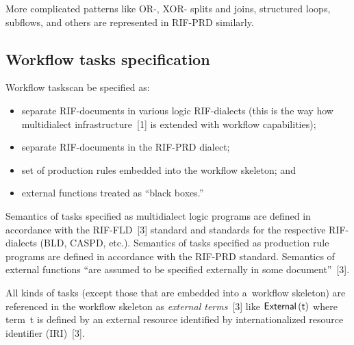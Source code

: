 \begin{multicols}{2}
\vspace*{-1.5pt}

  More complicated patterns like OR-, XOR- splits and joins, structured loops,
subflows, and others are represented in RIF-PRD similarly.

\vspace*{-6pt}

\subsection{Workflow tasks specification}

  \noindent
  Workflow taskscan be specified as:
  \begin{itemize}
\item separate RIF-documents in various logic RIF-dialects (this is the way how
multidialect infrastructure~[1] is extended with workflow capabilities);\\[-15pt]
\item separate RIF-documents in the RIF-PRD dialect;\\[-15pt]
\item set of production rules embedded into the workflow skeleton; and\\[-15pt]
\item external functions treated as ``black boxes.''
\end{itemize}

  Semantics of tasks specified as multidialect logic programs are defined in
accordance with the RIF-FLD~[3] standard and standards for the respective
  RIF-dialects (BLD, CASPD, etc.). Semantics of tasks specified as production
rule programs are defined in accordance with the RIF-PRD standard. Semantics of
external functions ``are assumed to be specified externally in some document''~[3].

  All kinds of tasks (except those that are embedded into a~workflow skeleton) are
referenced in the workflow skeleton as \textit{external terms}~[3] like
${\sf External}\left({\sf t}\right)$
where term~{\sf t} is defined by an external resource identified by internationalized
resource identifier (IRI)~[3].

\begin{figure*} %
\vspace*{1pt}
 \begin{center}
 \mbox{%
 \epsfxsize=163.675mm
 }
 \end{center}
 \vspace*{-9pt}
\end{figure*}



\end{multicols}
